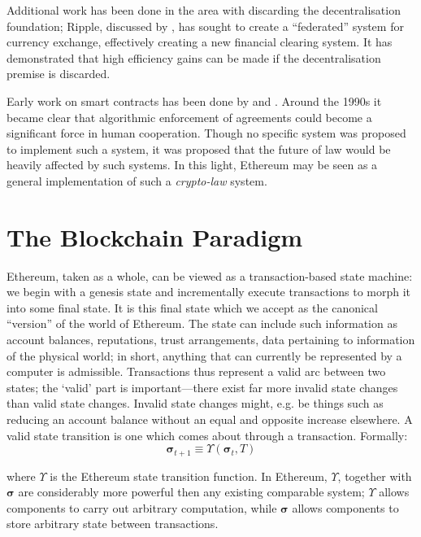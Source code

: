 \documentclass[9pt,oneside]{amsart}
\makeatletter
\newcommand*\eg{e.g.\@\xspace}
\makeatother
\begin{document}
\begin{multicols}{2}
Additional work has been done in the area with discarding the decentralisation foundation; Ripple, discussed by \cite{boutellier2014pirates}, has sought to create a ``federated'' system for currency exchange, effectively creating a new financial clearing system. It has demonstrated that high efficiency gains can be made if the decentralisation premise is discarded.

Early work on smart contracts has been done by \cite{szabo1997formalizing} and \cite{miller1997future}. Around the 1990s it became clear that algorithmic enforcement of agreements could become a significant force in human cooperation. Though no specific system was proposed to implement such a system, it was proposed that the future of law would be heavily affected by such systems. In this light, Ethereum may be seen as a general implementation of such a \textit{crypto-law} system.


\section{The Blockchain Paradigm} \label{ch:overview}

Ethereum, taken as a whole, can be viewed as a transaction-based state machine: we begin with a genesis state and incrementally execute transactions to morph it into some final state. It is this final state which we accept as the canonical ``version'' of the world of Ethereum. The state can include such information as account balances, reputations, trust arrangements, data pertaining to information of the physical world; in short, anything that can currently be represented by a computer is admissible. Transactions thus represent a valid arc between two states; the `valid' part is important---there exist far more invalid state changes than valid state changes. Invalid state changes might, \eg be things such as reducing an account balance without an equal and opposite increase elsewhere. A valid state transition is one which comes about through a transaction. Formally:
\begin{equation}
\boldsymbol{\sigma}_{t+1} \equiv \Upsilon(\boldsymbol{\sigma}_t, T)
\end{equation}

where $\Upsilon$ is the Ethereum state transition function. In Ethereum, $\Upsilon$, together with $\boldsymbol{\sigma}$ are considerably more powerful then any existing comparable system; $\Upsilon$ allows components to carry out arbitrary computation, while $\boldsymbol{\sigma}$ allows components to store arbitrary state between transactions.


\end{multicols}
\end{document}
